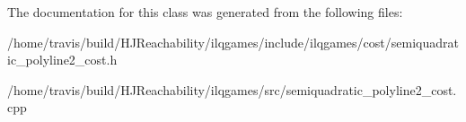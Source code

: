 The documentation for this class was generated from the following files\+:\begin{DoxyCompactItemize}
\item 
/home/travis/build/\+H\+J\+Reachability/ilqgames/include/ilqgames/cost/semiquadratic\+\_\+polyline2\+\_\+cost.\+h\item 
/home/travis/build/\+H\+J\+Reachability/ilqgames/src/semiquadratic\+\_\+polyline2\+\_\+cost.\+cpp\end{DoxyCompactItemize}
